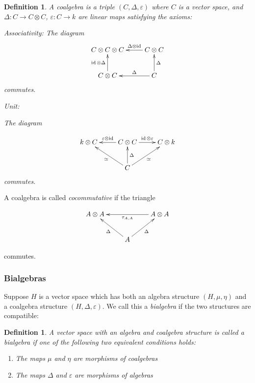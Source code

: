 \documentclass[]{article}
\newtheorem{defn}[theorem]{Definition}
\newcommand{\id}{\operatorname{id}}
\numberwithin{equation}{subsection}
\begin{document}
\begin{defn}
    A \emph{coalgebra} is a triple $(C, \Delta, \varepsilon)$ where $C$ is a
    vector space, and $\Delta: C \to C \otimes C$, $\varepsilon: C \to k$ are
    linear maps satisfying the axioms:

Associativity:
The diagram
\begin{equation}
\xymatrix{
C \otimes C \otimes C   & C \otimes C \ar[l]_-{\Delta \otimes \id}\\
 C \otimes C\ar[u]^-{\id \otimes \Delta}  & C \ar[l]_-\Delta \ar[u]_-{\Delta}
}
\end{equation}
commutes.

Unit: 

The diagram

\begin{equation}
    \xymatrix{
    k \otimes C  & C \otimes C \ar[l]_-{\varepsilon \otimes \id} \ar[r]^-{\id \otimes \varepsilon} & C \otimes k   \\
    & C \ar[u]_-\Delta \ar[lu]^-\simeq \ar[ru]_-{\simeq}&
    }
\end{equation}
commutes.
\end{defn}
A coalgebra is called \emph{cocommutative} if the triangle 

\begin{equation}
    \xymatrix{
    A \otimes A   & & A \ar[ll]^-{\tau_{A,A}} \otimes A  \\
    & \ar[lu]^-\Delta A \ar[ru]_-\Delta&
    }
\end{equation}

commutes.


\subsubsection{Bialgebras}

Suppose $H$ is a vector space which has both an algebra structure $(H, \mu,
\eta)$ and a coalgebra structure $(H, \Delta, \varepsilon)$. We call this a
\emph{bialgebra} if the two structures are compatible:

\begin{defn}
    A vector space with an algebra and coalgebra structure is called a
    \emph{bialgebra} if one of the following two equivalent conditions holds:

    \begin{enumerate}
        \item The maps $\mu$ and $\eta$ are morphisms of coalgebras
        \item The maps $\Delta$ and $\varepsilon$ are morphisms of algebras
    \end{enumerate}
\end{defn}
\end{document}
